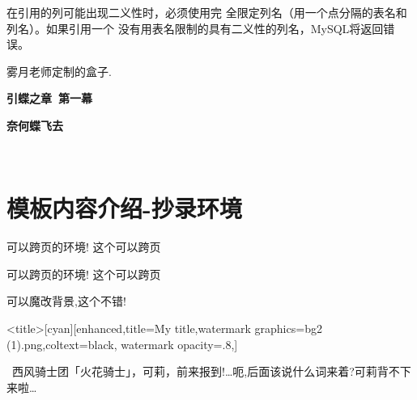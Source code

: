 \begin{tcblisting}{}
\begin{warning}[title={{\color{mred} \faDropbox} 完全限定列名：\ }]
在引用的列可能出现二义性时，必须使用完
全限定列名（用一个点分隔的表名和列名）。如果引用一个
没有用表名限制的具有二义性的列名，MySQL将返回错误。
\end{warning}
\end{tcblisting}

雾月老师定制的盒子.
\begin{ysbox}
\zhlipsum[2]
\end{ysbox}
%
\begin{ysbox}
\centering
\medskip
{\bfseries 引蝶之章\ 第一幕}
\par\bigskip

{\bfseries 奈何蝶飞去}

\par\medskip

\begin{center}
     \\
\end{center}
\centering
{}

\end{ysbox}


\section{模板内容介绍-抄录环境}
可以跨页的环境!
这个可以跨页
\btrule{}
\begin{tcblisting}{}
可以跨页的环境!
这个可以跨页
\btrule{}
\end{tcblisting}
%
%
可以魔改背景,这个不错!
\begin{ascolorbox5}[subtitle]{<title>}[cyan][enhanced,title=My title,watermark graphics=bg2
    (1).png,coltext=black,
    watermark opacity=.8,]
    \lipsum[2]
    \tcblower
    \begin{center}
    \end{center}
    \begin{center}{\textcolor[RGB]{255, 0,
                0}{\faHeart}~西风骑士团「火花骑士」，可莉，前来报到!…呃,后面该说什么词来着?可莉背不下来啦…~
            \textcolor[RGB]{255, 0, 0}{\faHeart}}
    \end{center}
\end{ascolorbox5}


